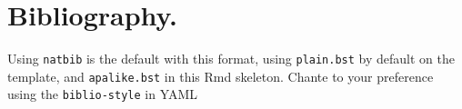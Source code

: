\documentclass[12pt]{article}
\begin{document}
\section{Bibliography.}\label{bibliography.}

Using \texttt{natbib} is the default with this format, using
\texttt{plain.bst} by default on the template, and \texttt{apalike.bst}
in this Rmd skeleton. Chante to your preference using the
\texttt{biblio-style} in YAML



\end{document}
